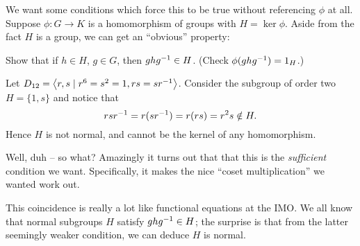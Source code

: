 We want some conditions which force this to be true without referencing $\phi$ at all.
Suppose $\phi : G \to K$ is a homomorphism of groups with $H = \ker\phi$.
Aside from the fact $H$ is a group, we can get an ``obvious'' property:
\begin{ques}
	Show that if $h \in H$, $g \in G$,
	then $ghg^{-1} \in H$.
	(Check $\phi(ghg^{-1}) = 1_H$.)
\end{ques}
\begin{example}
	\label{ex:dihedral_normal_subgroup}
	Let $D_{12} = \left<r,s \mid r^6=s^2=1, rs=sr^{-1}\right>$.
	Consider the subgroup of order two $H = \{1,s\}$
	and notice that \[ rsr^{-1} = r(sr^{-1})= r(rs) = r^2s \notin H. \]
	Hence $H$ is not normal, and cannot be the kernel of any homomorphism.
\end{example}
Well, duh -- so what?
Amazingly it turns out that that this is the \emph{sufficient} condition we want.
Specifically, it makes the nice ``coset multiplication'' we wanted work out.
\begin{remark}
	This coincidence is really a lot like functional equations at the IMO.
	We all know that normal subgroups $H$ satisfy $ghg^{-1} \in H$;
	the surprise is that from the latter seemingly weaker condition,
	we can deduce $H$ is normal.
\end{remark}

